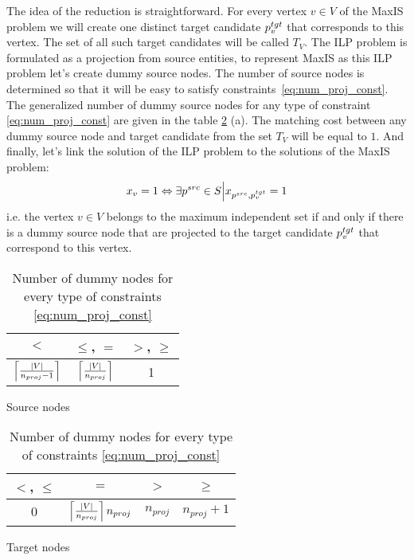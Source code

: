 The idea of the reduction is straightforward. For every vertex \( v \in V \) of the MaxIS problem
we will create one distinct target candidate \( p_v^{tgt} \) that corresponds to this vertex.
The set of all such target candidates will be called \( T_V \). The ILP problem is formulated as a projection
from source entities, to represent MaxIS as this ILP problem let's create dummy source nodes. The number of source nodes
is determined so that it will be easy to satisfy constraints~\eqref{eq:num_proj_const}.
The generalized number of dummy source nodes for any type of constraint \eqref{eq:num_proj_const} are given
in the table \ref{tab:dummy_nodes_num} (a). The matching cost between any dummy source node and
target candidate from the set \( T_V \) will be equal to \( 1 \). And finally, let's link the solution of the
ILP problem to the solutions of the MaxIS problem:
\[
  x_v = 1 \Leftrightarrow \exists p^{src} \in S \Big| x_{p^{src}, p_v^{tgt}} = 1
\]
i.e. the vertex \( v \in V \) belongs to the maximum independent set if and only if there is a dummy
source node that are projected to the target candidate \( p_v^{tgt} \) that correspond to this vertex.

\begin{table}[h]
  \begin{subtable}[t]{0.5\linewidth}
    \centering
    \renewcommand{\arraystretch}{1.5}
    \begin{tabular}{|c|c|c|}
      \hline
      \(<\)                                 & \( \leq \), \( = \)               & \(>\), \( \geq \) \\
      \hline
      \( \left\lceil \frac{|V|}{n_{proj} - 1} \right\rceil \) & \( \left\lceil \frac{|V|}{n_{proj}} \right\rceil \) & 1                 \\
      \hline
    \end{tabular}
    \caption{Source nodes}
    \label{tab:src_dummy_nodes_num}
  \end{subtable}
  \begin{subtable}[t]{0.5\linewidth}
    \centering
    \renewcommand{\arraystretch}{1.5}
    \begin{tabular}{|c|c|c|c|}
      \hline
      \(<\), \(\leq\) & \( = \)                                    & \(>\)          & \( \geq \)         \\
      \hline
      \( 0 \)         & \( \left\lceil \frac{|V|}{n_{proj}} \right\rceil n_{proj} \) & \( n_{proj} \) & \( n_{proj} + 1 \) \\
      \hline
    \end{tabular}
    \caption{Target nodes}
    \label{tab:tgt_dummy_nodes_num}
  \end{subtable}
  \caption{Number of dummy nodes for every type of constraints \eqref{eq:num_proj_const}}
  \label{tab:dummy_nodes_num}
\end{table}

